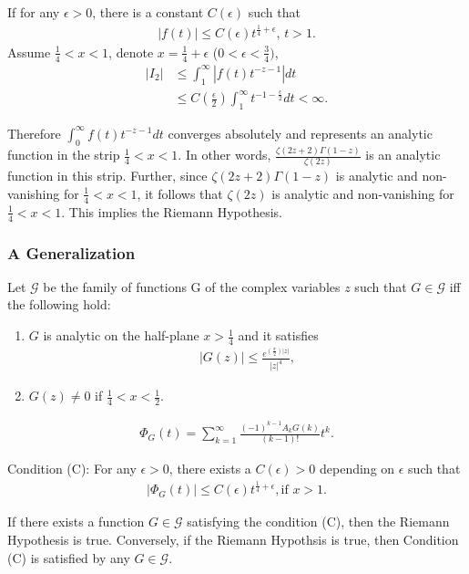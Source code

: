 \documentclass{beamer}
\newcommand{\G}{\mathcal G}
\begin{document}
\frame
{
If for any $\epsilon > 0$, there is a constant $C(\epsilon)$ such that
\begin{align*}
|f(t)| \leq C(\epsilon) t^{\frac{1}{4} + \epsilon} \mbox{, } t > 1.
\end{align*}
Assume $\frac{1}{4} < x < 1$, denote $x = \frac{1}{4} + \epsilon$ ($0 < \epsilon < \frac{3}{4})$,
\begin{align*}
|I_2| & \leq \int^{\infty}_{1} |f(t) t^{-z -1}| dt \\
           & \leq C(\frac{\epsilon}{2}) \int^{\infty}_{1} t^{-1-\frac{\epsilon}{2}} dt  < \infty .
\end{align*}
}

\frame
{
Therefore $\int^{\infty}_{0} f(t) t^{-z -1} dt$ converges absolutely and represents an 
analytic function in the strip $\frac{1}{4} < x < 1$. In other words, $\frac{\zeta(2z + 2)\Gamma(1-z)}{\zeta(2z)}$
is an analytic function in this strip. Further, since $\zeta(2z + 2)\Gamma(1-z)$ is analytic and non-vanishing
for $\frac{1}{4} < x < 1$, it follows that $\zeta(2z)$ is analytic and non-vanishing for $\frac{1}{4} < x < 1$.
This implies the Riemann Hypothesis.
} 

\frame
{
\frametitle{A Generalization}

Let $\G$ be the family of functions G of the complex variables $z$ such that $G \in \G$ iff the following hold:
 
  \begin{enumerate}
  \item $G$ is analytic on the half-plane $x > \frac{1}{4}$ and it satisfies
               \begin{align*}
                     |G(z)| \leq \frac{e^{(\frac{\pi}{2})|z|}}{|z|^4}, 
                 \end{align*}      
  \item $G(z) \neq 0$ if $\frac{1}{4} < x < \frac{1}{2}$.
  \end{enumerate}

}

\frame
{ 
\begin{align*}
\Phi_{G}(t) = \sum^{\infty}_{k = 1} \frac{(-1)^{k-1}A_k G(k)}{(k-1)!}t^k.
\end{align*}

Condition (C): For any $\epsilon > 0$, there exists a $C(\epsilon) > 0$ depending on $\epsilon$ such that
\begin{align*}
|\Phi_G (t)| \leq C(\epsilon) t^{\frac{1}{4} + \epsilon}, \mbox{if $x > 1$}.
\end{align*}

\begin{theorem}[A Generalization]
If there exists a function $G \in \G$ satisfying the condition (C), then the Riemann Hypothesis 
is true. Conversely, if the Riemann Hypothsis is true, then Condition (C) is satisfied by any $G \in \G$.
\end{theorem}

}
\end{document}
